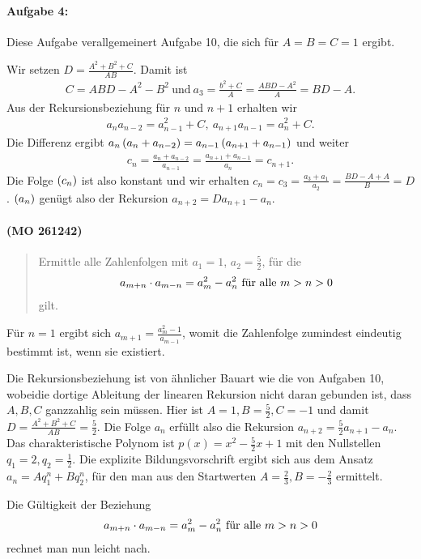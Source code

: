 \documentclass[11pt,a4paper]{article}
\begin{document}
\paragraph{Aufgabe 4:}
Diese Aufgabe verallgemeinert Aufgabe 10, die sich für $A=B=C=1$ ergibt. 

Wir setzen $D=\frac{A^2+B^2+C}{AB}$. Damit ist 
\begin{gather*}
  C=ABD-A^2-B^2\ \text{und}\ a_3=\frac{b^2+C}{A}=\frac{ABD-A^2}{A}=BD-A.
\end{gather*}
Aus der Rekursionsbeziehung für $n$ und $n+1$ erhalten wir
\begin{gather*}
  a_na_{n-2}=a_{n-1}^2+C,\ a_{n+1}a_{n-1}=a_n^2+C.
\end{gather*}
Die Differenz ergibt $a_n\left(a_n+a_{n-2}\right)=a_{n-1}\left(a_{n+1}+a_{n-1}\right)$ und
weiter 
\begin{gather*}
  c_n=\frac{a_n+a_{n-2}}{a_{n-1}}=\frac{a_{n+1}+a_{n-1}}{a_n}=c_{n+1}.
\end{gather*}
Die Folge $\left(c_n\right)$ ist also konstant und wir erhalten
$c_n=c_3=\frac{a_3+a_1}{a_2}=\frac{BD-A+A}{B}=D$.  $\left(a_n\right)$ genügt also der
Rekursion $a_{n+2}=Da_{n+1}-a_n$.

\paragraph{(MO 261242)}
\begin{quote}
  Ermittle alle Zahlenfolgen mit $a_1=1$, $a_2=\frac52$, für die
  \begin{gather*}
    a_{m+n}\cdot a_{m-n}=a_m^2-a_n^2\ \text{für alle}\ m>n>0
  \end{gather*}
  gilt.
\end{quote}
\begin{loesung}
  Für $n=1$ ergibt sich $a_{m+1}=\frac{a_m^2-1}{a_{m-1}}$, womit die
  Zahlenfolge zumindest eindeutig bestimmt ist, wenn sie existiert.

  Die Rekursionsbeziehung ist von ähnlicher Bauart wie die von Aufgaben 10,
  wobeidie dortige Ableitung der linearen Rekursion nicht daran gebunden ist,
  dass $A,B,C$ ganzzahlig sein müssen.  Hier ist $A=1, B=\frac52, C=-1$ und
  damit $D=\frac{A^2+B^2+C}{AB}=\frac52$.  Die Folge $a_n$ erfüllt also die
  Rekursion $a_{n+2}=\frac52a_{n+1}-a_n$.  Das charakteristische Polynom ist
  $p(x)=x^2-\frac52x+1$ mit den Nullstellen $q_1=2, q_2=\frac12$.  Die
  explizite Bildungsvorschrift ergibt sich aus dem Ansatz $a_n=Aq_1^n+Bq_2^n$,
  für den man aus den Startwerten $A=\frac23, B=-\frac23$ ermittelt.

  Die Gültigkeit der Beziehung
  \begin{gather*}
    a_{m+n}\cdot a_{m-n}=a_m^2-a_n^2\ \text{für alle}\ m>n>0
  \end{gather*}
  rechnet man nun leicht nach.
\end{loesung}
\end{document}
